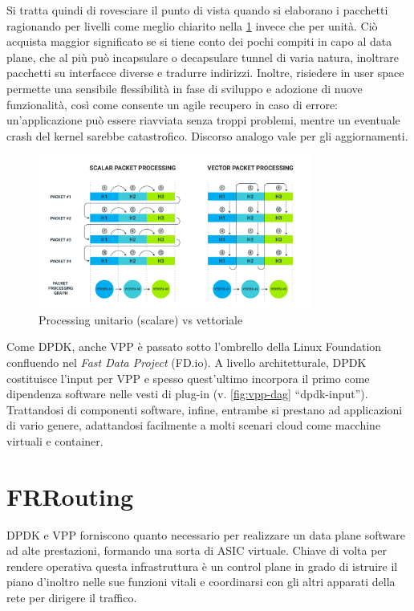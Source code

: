 Si tratta quindi di rovesciare il punto di vista quando si elaborano i pacchetti ragionando per livelli come meglio chiarito nella \cref{fig:scalar-vs-vector-packet-processing} invece che per unità. Ciò acquista maggior significato se si tiene conto dei pochi compiti in capo al data plane, che al più può incapsulare o decapsulare tunnel di varia natura, inoltrare pacchetti su interfacce diverse e tradurre indirizzi. Inoltre, risiedere in user space permette una sensibile flessibilità in fase di sviluppo e adozione di nuove funzionalità, così come consente un agile recupero in caso di errore: un'applicazione può essere riavviata senza troppi problemi, mentre un eventuale crash del kernel sarebbe catastrofico. Discorso analogo vale per gli aggiornamenti.

\begin{figure}[htb]
    \includegraphics[width=0.8\textwidth]{graphics/codilime_scalar_packet_processing_vs_vector_packet_processing.png}
    \caption{Processing unitario (scalare) vs vettoriale}
    \label{fig:scalar-vs-vector-packet-processing}
\end{figure}

Come DPDK, anche VPP è passato sotto l'ombrello della Linux Foundation confluendo nel \textit{Fast Data Project} (FD.io). A livello architetturale, DPDK costituisce l'input per VPP e spesso quest'ultimo incorpora il primo come dipendenza software nelle vesti di plug-in (v. \cref{fig:vpp-dag} ``dpdk-input''). Trattandosi di componenti software, infine, entrambe si prestano ad applicazioni di vario genere, adattandosi facilmente a molti scenari cloud come macchine virtuali e container.

\section{FRRouting}

DPDK e VPP forniscono quanto necessario per realizzare un data plane software ad alte prestazioni, formando una sorta di ASIC virtuale. Chiave di volta per rendere operativa questa infrastruttura è un control plane in grado di istruire il piano d'inoltro nelle sue funzioni vitali e coordinarsi con gli altri apparati della rete per dirigere il traffico.

